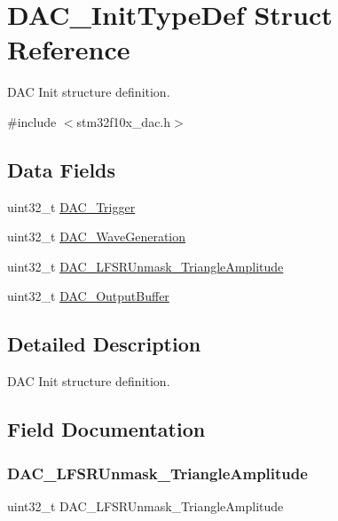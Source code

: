 \hypertarget{struct_d_a_c___init_type_def}{}\section{D\+A\+C\+\_\+\+Init\+Type\+Def Struct Reference}
\label{struct_d_a_c___init_type_def}


D\+AC Init structure definition.  




{\ttfamily \#include $<$stm32f10x\+\_\+dac.\+h$>$}

\subsection*{Data Fields}
\begin{DoxyCompactItemize}
\item 
uint32\+\_\+t \mbox{\hyperlink{struct_d_a_c___init_type_def_ae1edfee233aee962b357cbc3994b330b}{D\+A\+C\+\_\+\+Trigger}}
\item 
uint32\+\_\+t \mbox{\hyperlink{struct_d_a_c___init_type_def_a3dfc2e2197154ed20469e57ccff591d3}{D\+A\+C\+\_\+\+Wave\+Generation}}
\item 
uint32\+\_\+t \mbox{\hyperlink{struct_d_a_c___init_type_def_aff0a3e0149873939ded70bc466c85dc2}{D\+A\+C\+\_\+\+L\+F\+S\+R\+Unmask\+\_\+\+Triangle\+Amplitude}}
\item 
uint32\+\_\+t \mbox{\hyperlink{struct_d_a_c___init_type_def_a22d062287d8cbba2342585ea7944f61d}{D\+A\+C\+\_\+\+Output\+Buffer}}
\end{DoxyCompactItemize}


\subsection{Detailed Description}
D\+AC Init structure definition. 

\subsection{Field Documentation}
\mbox{\label{struct_d_a_c___init_type_def_aff0a3e0149873939ded70bc466c85dc2}} 
\subsubsection{\texorpdfstring{DAC\_LFSRUnmask\_TriangleAmplitude}{DAC\_LFSRUnmask\_TriangleAmplitude}}
{\footnotesize\ttfamily uint32\+\_\+t D\+A\+C\+\_\+\+L\+F\+S\+R\+Unmask\+\_\+\+Triangle\+Amplitude}

